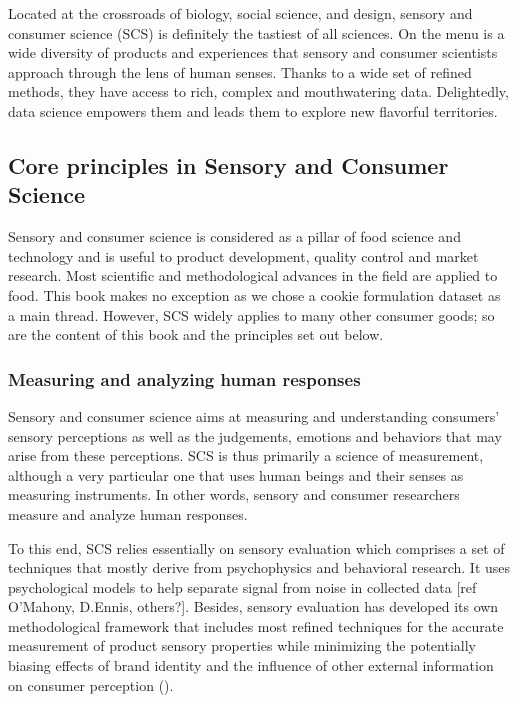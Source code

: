 \documentclass[
]{book}
\begin{document}
Located at the crossroads of biology, social science, and design, sensory and consumer science (SCS) is definitely the tastiest of all sciences. On the menu is a wide diversity of products and experiences that sensory and consumer scientists approach through the lens of human senses. Thanks to a wide set of refined methods, they have access to rich, complex and mouthwatering data. Delightedly, data science empowers them and leads them to explore new flavorful territories.

\hypertarget{core-principles-in-sensory-and-consumer-science}{%
\subsection*{Core principles in Sensory and Consumer Science}\label{core-principles-in-sensory-and-consumer-science}}

Sensory and consumer science is considered as a pillar of food science and technology and is useful to product development, quality control and market research. Most scientific and methodological advances in the field are applied to food. This book makes no exception as we chose a cookie formulation dataset as a main thread. However, SCS widely applies to many other consumer goods; so are the content of this book and the principles set out below.

\hypertarget{measuring-and-analyzing-human-responses}{%
\subsubsection*{Measuring and analyzing human responses}\label{measuring-and-analyzing-human-responses}}

Sensory and consumer science aims at measuring and understanding consumers' sensory perceptions as well as the judgements, emotions and behaviors that may arise from these perceptions. SCS is thus primarily a science of measurement, although a very particular one that uses human beings and their senses as measuring instruments. In other words, sensory and consumer researchers measure and analyze human responses.

To this end, SCS relies essentially on sensory evaluation which comprises a set of techniques that mostly derive from psychophysics and behavioral research. It uses psychological models to help separate signal from noise in collected data {[}ref O'Mahony, D.Ennis, others?{]}. Besides, sensory evaluation has developed its own methodological framework that includes most refined techniques for the accurate measurement of product sensory properties while minimizing the potentially biasing effects of brand identity and the influence of other external information on consumer perception (\citet{LawlessHeym2010}).
\end{document}
